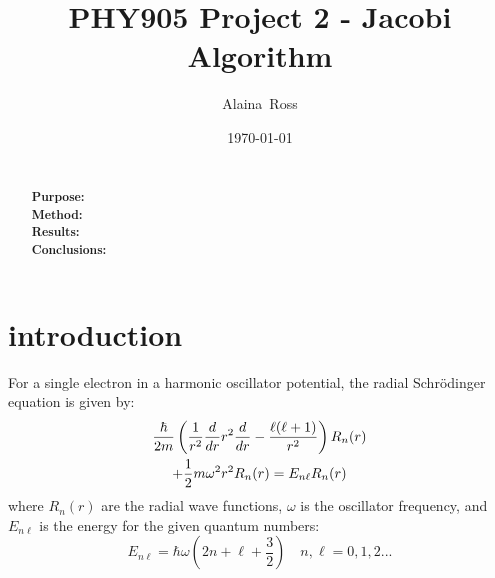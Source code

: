 \documentclass[prc,amsmath,twocolumn,superscriptaddress]{revtex4}
\begin{document}
  \newcommand {\nc} {\newcommand}
  \nc {\Sec} [1] {Sec.~\ref{#1}}
  \nc {\IR} [1] {\textcolor{red}{#1}} 

\title{PHY905 Project 2 - Jacobi Algorithm}


\author{Alaina~Ross}

\date{\today}


\begin{abstract}
\\ {\bf Purpose:} %
\\ {\bf Method:} %
\\ {\bf Results:} %
 \\ {\bf Conclusions:} %
\end{abstract}


\maketitle

\section{introduction}
\label{intro}
For a single electron in a harmonic oscillator potential, the radial Schr{\"o}dinger equation is given by:
\begin{gather}
\frac{\hbar}{2m}\left(\frac{1}{r^2}\frac{d}{dr}r^2\frac{d}{dr}-\frac{\ell(\ell+1)}{r^2}\right)R_n(r) \notag \\
+\frac{1}{2}m\omega^2r^2 R_n(r)=E_{n\ell}R_n(r)
\end{gather}
where $R_n(r)$ are the radial wave functions, $\omega$ is the oscillator frequency, and $E_{n\ell}$ is the energy for the given quantum numbers:
\begin{equation}
E_{n\ell}=\hbar\omega\left(2n+\ell+\frac{3}{2}\right) \quad n,\ell = 0,1,2...
\end{equation}
\end{document}
